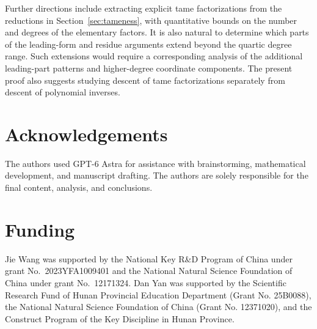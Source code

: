 \documentclass[11pt,reqno]{amsart}
\numberwithin{equation}{section}
\theoremstyle{plain}
\theoremstyle{definition}
\theoremstyle{remark}
\begin{document}
Further directions include extracting explicit
tame factorizations from the reductions in Section~\ref{sec:tameness},
with quantitative bounds on the number and degrees of the elementary
factors. It is also natural to determine which parts of the leading-form and
residue arguments extend beyond the quartic degree range. Such extensions
would require a corresponding analysis of the additional leading-part
patterns and higher-degree coordinate components. The present proof also
suggests studying descent of tame factorizations separately from descent
of polynomial inverses.

\section*{Acknowledgements}
The authors used GPT-6 Astra for assistance with brainstorming,
mathematical development, and manuscript drafting. The authors are solely
responsible for the final content, analysis, and conclusions.

\section*{Funding}
Jie Wang was supported by the National Key R\&D Program of China under grant No.~2023YFA1009401 and the National Natural Science Foundation of China under grant No.~12171324.
Dan Yan was supported by the Scientific Research Fund of Hunan Provincial Education Department (Grant No. 25B0088), the National Natural Science Foundation of China (Grant No. 12371020), and the Construct Program of the Key Discipline in Hunan Province.
\end{document}
